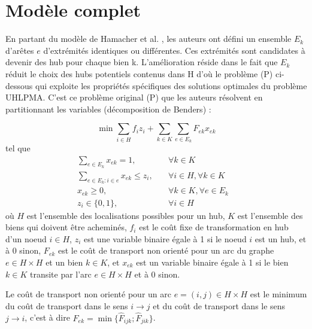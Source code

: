 \section{Modèle complet}

En partant du modèle de Hamacher et al. \cite[Adapting polyhedral properties from facility to hub location problems (2004)]{hln}, les auteurs ont défini un ensemble $E_k$ d'arêtes $e$ d'extrémités identiques ou différentes. Ces extrémités sont candidates à devenir des hub pour chaque bien k. L'amélioration réside dans le fait que $E_k$ réduit le choix des hubs potentiels contenus dans H d'où le problème (P) ci-dessous qui exploite les propriétés spécifiques des solutions optimales du problème UHLPMA. C'est ce problème original (P) que les auteurs résolvent en partitionnant les variables (décomposition de Benders) : 

\[ \min \sum_{i \in H}f_iz_i + \sum_{k \in K}\sum_{e \in E_k}F_{ek}x_{ek}\]
tel que
\begin{subequations}
    \begin{align}
        \sum_{e \in E_k}x_{ek} = 1, \quad &\forall{k\in K}&\\
        \sum_{e \in E_k:i\in e}x_{ek} \le z_i,\quad &\forall{i \in H}, \forall{k\in K}&\\
        x_{ek} \ge 0, \quad &\forall{k \in K}, \forall{e \in E_k}&\\
        z_i\in \{0,1\},\quad &\forall{ i \in H}&
    \end{align}
\end{subequations}
 où $H$ est l'ensemble des localisations possibles pour un hub, $K$ est l'ensemble des biens qui doivent être acheminés, $f_i$ est le coût fixe de transformation en hub d'un noeud $i\in H$, $z_i$ est une variable binaire égale à 1 si le noeud $i$ est un hub, et à 0 sinon, $F_{ek}$ est le coût de transport non orienté pour un arc du graphe $e \in H\times H$ et un bien $k \in K$, et $x_{ek}$ est un variable binaire égale à 1 si le bien $k \in K$ transite par l'arc $e \in H\times H$ et à 0 sinon.
 
 Le coût de transport non orienté pour un arc $e = (i,j) \in H\times H$ est le minimum du coût de transport dans le sens $i \rightarrow j$ et du coût de transport dans le sens $j \rightarrow i$, c'est à dire $F_{ek} = \min \{ \hat{F}_{ijk};\hat{F}_{jik}\}$.



